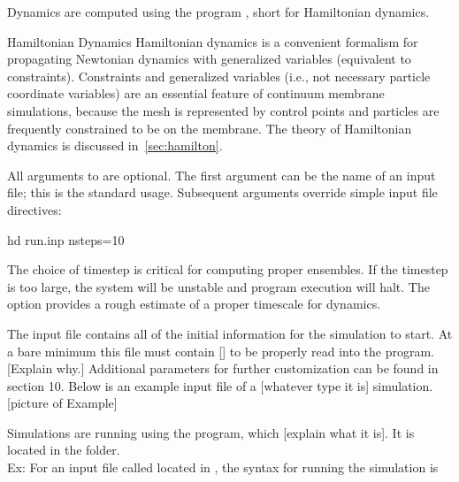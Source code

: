 

Dynamics are computed using the program , short for Hamiltonian dynamics. 

\begin{bcomment}{Hamiltonian Dynamics}
Hamiltonian dynamics is a convenient formalism for propagating Newtonian dynamics with generalized variables (equivalent to constraints). Constraints and generalized variables (i.e., not necessary particle coordinate variables) are an essential feature of continuum membrane simulations, because the mesh is represented by control points and particles are frequently constrained to be on the membrane. The theory of Hamiltonian dynamics is discussed in~\cref{sec:hamilton}. 
\end{bcomment}

All arguments to  are optional.
The first argument can be the name of an input file; this is the standard usage.
Subsequent arguments override simple input file directives:
\begin{command}
hd run.inp nsteps=10
\label{cmd:hd}
\end{command}



The choice of timestep is critical for computing proper ensembles. 
If the timestep is too large, the system will be unstable and program execution will halt.
The option  provides a rough estimate of a proper timescale for dynamics.

The input file contains all of the initial information for the simulation to start. At a bare minimum this file must contain [] to be properly read into the program. [Explain why.] Additional parameters for further customization can be found in section 10. Below is an example input file of a [whatever type it is] simulation. \\ 

[picture of Example]

Simulations are running using the  program, which [explain what it is]. It is located in the  folder. \\

Ex: For an input file called  located in , the syntax for running the simulation is \\

